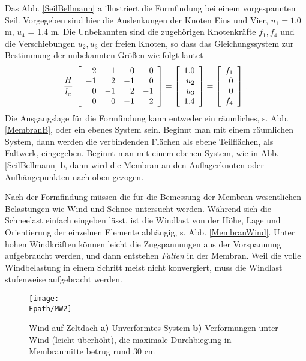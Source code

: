 Das Abb. \ref{SeilBellmann} a illustriert die Formfindung bei einem vorgespannten Seil. Vorgegeben sind hier die Auslenkungen der Knoten Eins und Vier, $u_1 = 1.0$ m, $u_4$ = 1.4 m. Die Unbekannten sind die zugeh\"{o}rigen Knotenkr\"{a}fte $f_1, f_4$ und die Verschiebungen $u_2, u_3$ der freien Knoten, so dass das Gleichungssystem zur Bestimmung der unbekannten Gr\"{o}{\ss}en wie folgt lautet
\begin{align}
\frac{H}{l_e}\,\left[\begin{array}{r r r r }
  2 & -1 & 0 & 0 \\
  -1 & 2 & -1 & 0 \\
  0 &-1 & 2 & -1 \\
  0 & 0& -1 & 2
\end{array}\right] = \left[\begin{array}{r}
  1.0 \\
  u_2 \\
  u_3 \\
  1.4
\end{array}\right] = \left[\begin{array}{r}
  f_1 \\
  0 \\
  0 \\
  f_4
\end{array}\right]\,.
\end{align}
Die Ausgangslage f\"{u}r die Formfindung kann entweder ein r\"{a}umliches, s. Abb. \ref{MembranB}, oder ein ebenes System sein. Beginnt man mit einem r\"{a}umlichen System, dann werden die verbindenden Fl\"{a}chen als ebene Teilfl\"{a}chen, als Faltwerk, eingegeben. Beginnt man mit einem ebenen System, wie in Abb. \ref{SeilBellmann} b, dann wird die Membran an den Auflagerknoten oder Aufh\"{a}ngepunkten nach oben gezogen.

Nach der Formfindung m\"{u}ssen die f\"{u}r die Bemessung der Membran wesentlichen Belastungen wie Wind und Schnee untersucht werden. W\"{a}hrend sich die Schneelast einfach eingeben l\"{a}sst, ist die Windlast von der H\"{o}he, Lage und Orientierung der einzelnen Elemente abh\"{a}ngig, s. Abb. \ref{MembranWind}. Unter hohen Windkr\"{a}ften k\"{o}nnen leicht die Zugspannungen aus der Vorspannung aufgebraucht werden, und dann entstehen {\em Falten\/} in der Membran. Weil die volle Windbelastung in einem Schritt meist nicht konvergiert, muss die Windlast stufenweise aufgebracht werden.
\vspace{-1.2cm}
\begin{figure}[tbp] \centering
\if {} \sidecaption \fi
\texttt{[image: \\Fpath/MW2]}
\caption{Wind auf Zeltdach {\bf a)} Unverformtes System {\bf b)}
Verformungen unter Wind (leicht \"{u}berh\"{o}ht), die maximale Durchbiegung in Membranmitte betrug rund 30 cm}  \label{MW2}
\end{figure}%

